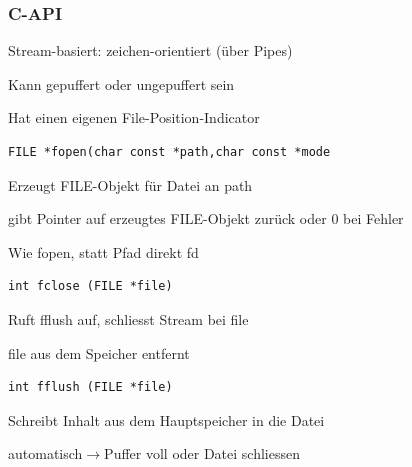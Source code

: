 \begin{multicols*}{5}
			
			




			
			
	\subsubsection{C-API}
		\begin{compactitem}[$\bullet$]
			\item Stream-basiert: zeichen-orientiert (über Pipes)
			\item Kann gepuffert oder ungepuffert sein
			\item Hat einen eigenen File-Position-Indicator
			\end{compactitem}
		
			\vspace{-6pt}
			\begin{lstlisting}
FILE *fopen(char const *path,char const *mode
			\end{lstlisting}
			\vspace{-6pt}
			\begin{compactitem}[$\bullet$]
				\item Erzeugt FILE-Objekt für Datei an path
				\item gibt Pointer auf erzeugtes FILE-Objekt zurück oder 0 bei Fehler
				\item Wie fopen, statt Pfad direkt fd
			\end{compactitem}
		

			\vspace{-6pt}
			\begin{lstlisting}
int fclose (FILE *file)
			\end{lstlisting}
			\vspace{-6pt}
			\begin{compactitem}[$\bullet$]
				\item Ruft fflush auf, schliesst Stream bei file
				\item file aus dem Speicher entfernt
			\end{compactitem}
		
			
		
		
			\vspace{-6pt}
			\begin{lstlisting}
int fflush (FILE *file)
			\end{lstlisting}
			\vspace{-6pt}
			\begin{compactitem}[$\bullet$]
				\item Schreibt Inhalt aus dem Hauptspeicher in die Datei
				\item automatisch$\rightarrow$Puffer voll oder Datei schliessen
			\end{compactitem}
		

\end{multicols*}
